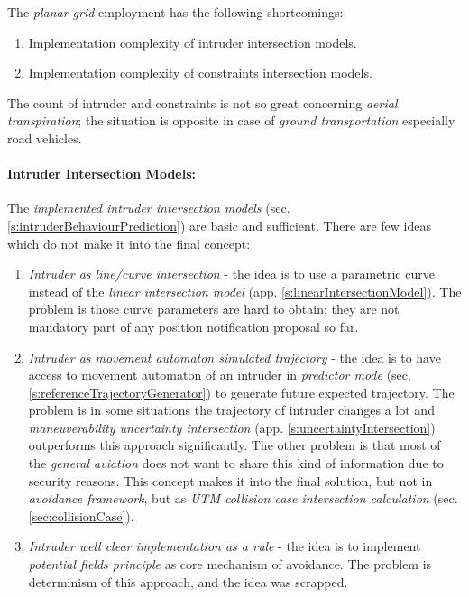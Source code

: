 \noindent The \emph{planar grid} employment has the following shortcomings:
\begin{enumerate}
    \item Implementation complexity of intruder intersection models.
    \item Implementation complexity of constraints intersection models.
\end{enumerate}

\begin{note}
    The count of intruder and constraints is not so great concerning \emph{aerial transpiration}; the situation is opposite in case of \emph{ground transportation} especially road vehicles. 
\end{note}

\paragraph{Intruder Intersection Models:} The \emph{implemented intruder intersection models} (sec. \ref{s:intruderBehaviourPrediction}) are basic and sufficient. There are few ideas which do not make it into the final concept:

\begin{enumerate}
    \item \emph{Intruder as line/curve intersection} - the idea is to use a parametric curve instead of the \emph{linear intersection model} (app. \ref{s:linearIntersectionModel}). The problem is those curve parameters are hard to obtain; they are not mandatory part of any position notification proposal so far.
	
	\item \emph{Intruder as movement automaton simulated trajectory} - the idea is to have access to movement automaton of an intruder in \emph{predictor mode} (sec. \ref{s:referenceTrajectoryGenerator}) to generate future expected trajectory. The problem is in some situations the trajectory of intruder changes a lot and \emph{maneuverability uncertainty intersection} (app. \ref{s:uncertaintyIntersection}) outperforms this approach significantly. The other problem is that most of the \emph{general aviation} does not want to share this kind of information due to security reasons.  This concept makes it into the final solution, but not in \emph{avoidance framework}, but as \emph{UTM collision case intersection calculation} (sec. \ref{sec:collisionCase}).
	
	\item \emph{Intruder well clear implementation as a rule} - the idea is to implement \emph{potential fields principle} as core mechanism of avoidance. The problem is determinism of this approach, and the idea was scrapped.
\end{enumerate}

